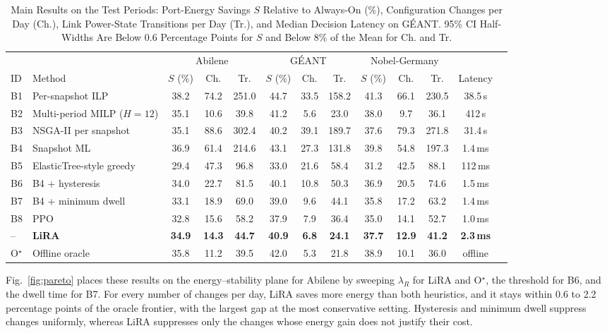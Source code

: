 \documentclass[journal]{IEEEtran}
\begin{document}
\begin{table}[t]
\centering
\caption{Main Results on the Test Periods: Port-Energy Savings $S$ Relative to Always-On (\%), Configuration Changes per Day (Ch.), Link Power-State Transitions per Day (Tr.), and Median Decision Latency on G\'{E}ANT. 95\% CI Half-Widths Are Below 0.6 Percentage Points for $S$ and Below 8\% of the Mean for Ch. and Tr.}
\label{tab:main}
\footnotesize
\setlength{\tabcolsep}{4.5pt}
\begin{tabular}{@{}llccccccccccc@{}}
\toprule
& & \multicolumn{3}{c}{Abilene} & \multicolumn{3}{c}{G\'{E}ANT} & \multicolumn{3}{c}{Nobel-Germany} & \\
\cmidrule(lr){3-5}\cmidrule(lr){6-8}\cmidrule(lr){9-11}
ID & Method & $S$ (\%) & Ch. & Tr. & $S$ (\%) & Ch. & Tr. & $S$ (\%) & Ch. & Tr. & Latency \\
\midrule
B1 & Per-snapshot ILP & 38.2 & 74.2 & 251.0 & 44.7 & 33.5 & 158.2 & 41.3 & 66.1 & 230.5 & 38.5\,s \\
B2 & Multi-period MILP ($H=12$) & 35.1 & 10.6 & 39.8 & 41.2 & 5.6 & 23.0 & 38.0 & 9.7 & 36.1 & 412\,s \\
B3 & NSGA-II per snapshot & 35.1 & 88.6 & 302.4 & 40.2 & 39.1 & 189.7 & 37.6 & 79.3 & 271.8 & 31.4\,s \\
B4 & Snapshot ML & 36.9 & 61.4 & 214.6 & 43.1 & 27.3 & 131.8 & 39.8 & 54.8 & 197.3 & 1.4\,ms \\
B5 & ElasticTree-style greedy & 29.4 & 47.3 & 96.8 & 33.0 & 21.6 & 58.4 & 31.2 & 42.5 & 88.1 & 112\,ms \\
B6 & B4 + hysteresis & 34.0 & 22.7 & 81.5 & 40.1 & 10.8 & 50.3 & 36.9 & 20.5 & 74.6 & 1.5\,ms \\
B7 & B4 + minimum dwell & 33.1 & 18.9 & 69.0 & 39.0 & 9.6 & 44.1 & 35.8 & 17.2 & 63.2 & 1.4\,ms \\
B8 & PPO & 32.8 & 15.6 & 58.2 & 37.9 & 7.9 & 36.4 & 35.0 & 14.1 & 52.7 & 1.0\,ms \\
\midrule
-- & \textbf{LiRA} & \textbf{34.9} & \textbf{14.3} & \textbf{44.7} & \textbf{40.9} & \textbf{6.8} & \textbf{24.1} & \textbf{37.7} & \textbf{12.9} & \textbf{41.2} & \textbf{2.3\,ms} \\
O$^\star$ & Offline oracle & 35.8 & 11.2 & 39.5 & 42.0 & 5.3 & 21.8 & 38.9 & 10.1 & 36.0 & offline \\
\bottomrule
\end{tabular}
\end{table}

Fig.~\ref{fig:pareto} places these results on the energy--stability plane for Abilene by sweeping $\lambda_R$ for LiRA and O$^\star$, the threshold for B6, and the dwell time for B7. For every number of changes per day, LiRA saves more energy than both heuristics, and it stays within 0.6 to 2.2 percentage points of the oracle frontier, with the largest gap at the most conservative setting. Hysteresis and minimum dwell suppress changes uniformly, whereas LiRA suppresses only the changes whose energy gain does not justify their cost.
\end{document}
